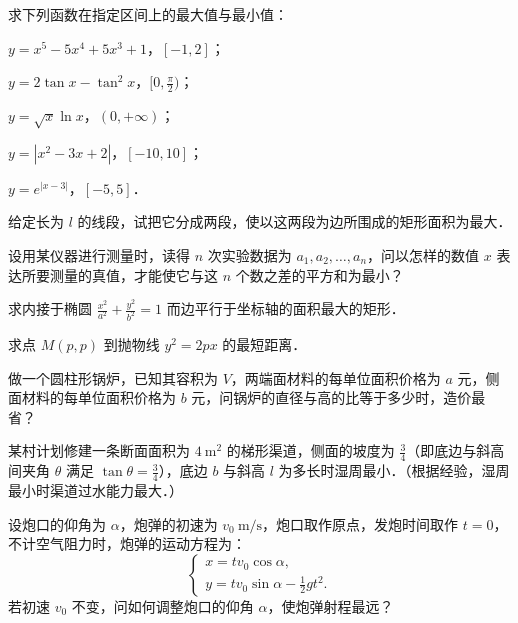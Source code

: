 \begin{xiti}
\item 求下列函数在指定区间上的最大值与最小值：
\begin{ziti}
\item $y = x^5 - 5x^4 + 5x^3 + 1$，$[-1, 2]$；
\item $y = 2\tan x - \tan^2 x$，$[0, \frac{\pi}{2})$；
\item $y = \sqrt{x}\ln x$，$(0, +\infty)$；
\item $y = |x^2 - 3x + 2|$，$[-10, 10]$；
\item $y = e^{|x-3|}$，$[-5, 5]$．
\end{ziti}
\item 给定长为 $l$ 的线段，试把它分成两段，使以这两段为边所围成的矩形面积为最大．
\item 设用某仪器进行测量时，读得 $n$ 次实验数据为 $a_1, a_2, \dots, a_n$，问以怎样的数值 $x$ 表达所要测量的真值，才能使它与这 $n$ 个数之差的平方和为最小？
\item 求内接于椭圆 $\frac{x^2}{a^2} + \frac{y^2}{b^2} = 1$ 而边平行于坐标轴的面积最大的矩形．
\item 求点 $M(p, p)$ 到抛物线 $y^2 = 2px$ 的最短距离．
\item 做一个圆柱形锅炉，已知其容积为 $V$，两端面材料的每单位面积价格为 $a$ 元，侧面材料的每单位面积价格为 $b$ 元，问锅炉的直径与高的比等于多少时，造价最省？
\item 某村计划修建一条断面面积为 $4\ \mathrm{m}^2$ 的梯形渠道，侧面的坡度为 $\frac{3}{4}$（即底边与斜高间夹角 $\theta$ 满足 $\tan\theta = \frac{3}{4}$），底边 $b$ 与斜高 $l$ 为多长时湿周最小．（根据经验，湿周最小时渠道过水能力最大．）
\item 设炮口的仰角为 $\alpha$，炮弹的初速为 $v_0\ \mathrm{m/s}$，炮口取作原点，发炮时间取作 $t = 0$，不计空气阻力时，炮弹的运动方程为：
\[
\begin{cases}
x = t v_0 \cos\alpha, \\
y = t v_0 \sin\alpha - \frac{1}{2}gt^2.
\end{cases}
\]
若初速 $v_0$ 不变，问如何调整炮口的仰角 $\alpha$，使炮弹射程最远？
\end{xiti}
